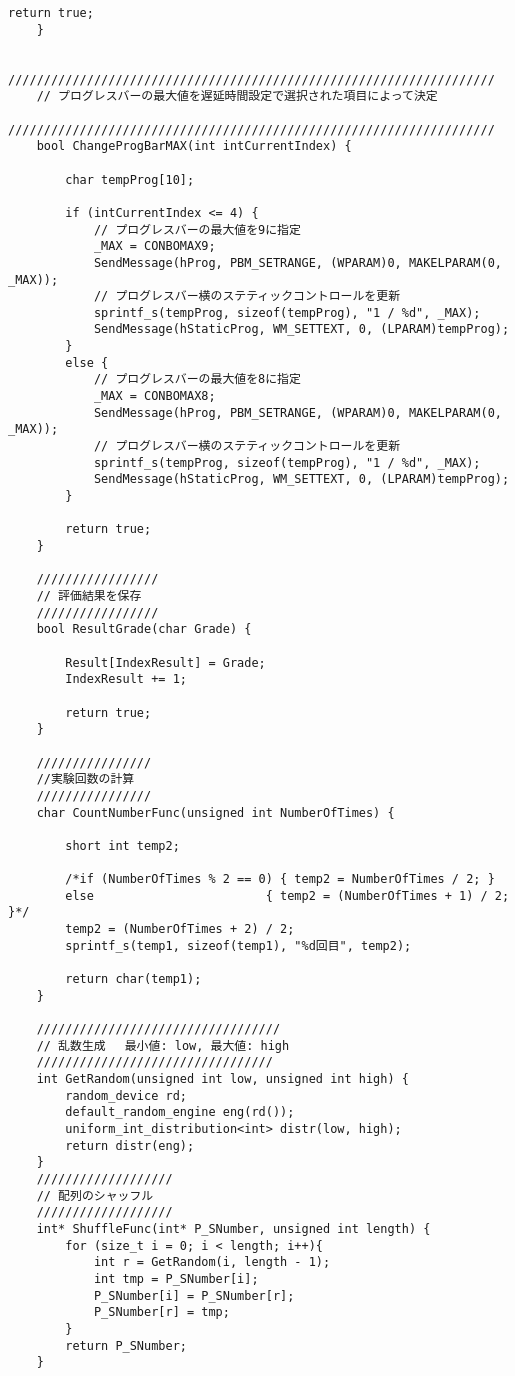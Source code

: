 \begin{lstlisting}[caption=main.cpp]
		return true;
	}
	
	////////////////////////////////////////////////////////////////////
	// プログレスバーの最大値を遅延時間設定で選択された項目によって決定
	////////////////////////////////////////////////////////////////////
	bool ChangeProgBarMAX(int intCurrentIndex) {
	
		char tempProg[10];
	
		if (intCurrentIndex <= 4) {
			// プログレスバーの最大値を9に指定
			_MAX = CONBOMAX9;
			SendMessage(hProg, PBM_SETRANGE, (WPARAM)0, MAKELPARAM(0, _MAX));
			// プログレスバー横のステティックコントロールを更新
			sprintf_s(tempProg, sizeof(tempProg), "1 / %d", _MAX);
			SendMessage(hStaticProg, WM_SETTEXT, 0, (LPARAM)tempProg);
		}
		else {
			// プログレスバーの最大値を8に指定
			_MAX = CONBOMAX8;
			SendMessage(hProg, PBM_SETRANGE, (WPARAM)0, MAKELPARAM(0, _MAX));
			// プログレスバー横のステティックコントロールを更新
			sprintf_s(tempProg, sizeof(tempProg), "1 / %d", _MAX);
			SendMessage(hStaticProg, WM_SETTEXT, 0, (LPARAM)tempProg);
		}
	
		return true;
	}
	
	/////////////////
	// 評価結果を保存
	/////////////////
	bool ResultGrade(char Grade) {
	
		Result[IndexResult] = Grade;
		IndexResult += 1;
	
		return true;
	}
	
	////////////////
	//実験回数の計算
	////////////////
	char CountNumberFunc(unsigned int NumberOfTimes) {
	
		short int temp2;
	
		/*if (NumberOfTimes % 2 == 0) { temp2 = NumberOfTimes / 2; }
		else                        { temp2 = (NumberOfTimes + 1) / 2; }*/
		temp2 = (NumberOfTimes + 2) / 2;
		sprintf_s(temp1, sizeof(temp1), "%d回目", temp2);
	
		return char(temp1);
	}
	
	//////////////////////////////////
	// 乱数生成 　最小値: low, 最大値: high
	/////////////////////////////////
	int GetRandom(unsigned int low, unsigned int high) {
		random_device rd;
		default_random_engine eng(rd());
		uniform_int_distribution<int> distr(low, high);
		return distr(eng);
	}
	///////////////////
	// 配列のシャッフル
	///////////////////
	int* ShuffleFunc(int* P_SNumber, unsigned int length) {
		for (size_t i = 0; i < length; i++){
			int r = GetRandom(i, length - 1);
			int tmp = P_SNumber[i];
			P_SNumber[i] = P_SNumber[r];
			P_SNumber[r] = tmp;
		}
		return P_SNumber;
	}
	

\end{lstlisting}
